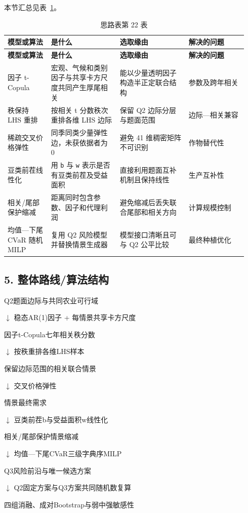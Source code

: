 \documentclass[UTF8,11pt,a4paper]{ctexart}
\begin{document}
\noindent 本节汇总见表~\ref{tab:thought-22}。
\begin{longtable}{@{}>{\raggedright\arraybackslash}p{0.17\linewidth}>{\raggedright\arraybackslash}p{0.27\linewidth}>{\raggedright\arraybackslash}p{0.27\linewidth}>{\raggedright\arraybackslash}p{0.23\linewidth}@{}}
\caption{思路表第 22 表}\label{tab:thought-22}\\
\toprule
\textbf{模型或算法} & \textbf{是什么} & \textbf{选取缘由} & \textbf{解决的问题} \\
\midrule
\endfirsthead
\toprule
\textbf{模型或算法} & \textbf{是什么} & \textbf{选取缘由} & \textbf{解决的问题} \\
\midrule
\endhead
因子 t-Copula & 宏观、气候和类别因子与共享卡方尺度共同产生厚尾相关 & 能以少量透明因子构造半正定联合结构 & 参数及跨年相关 \\
秩保持 LHS 重排 & 按相关 t 分数秩次重排各维 LHS 边际 & 保留 Q2 边际分层与题面范围 & 边际—相关兼容 \\
稀疏交叉价格弹性 & 同季同类少量弹性边，未获依据者为 0 & 避免 41 维稠密矩阵不可识别 & 作物替代性 \\
豆类前茬线性化 & 用 \texttt{b} 与 \texttt{w} 表示是否有豆类前茬及受益面积 & 直接利用题面互补机制且保持线性 & 生产互补性 \\
相关/尾部保护缩减 & 距离同时包含参数、因子和代理利润 & 避免缩减后丢失联合尾部和相关方向 & 计算规模控制 \\
均值—下尾 CVaR 随机 MILP & 复用 Q2 风险模型并替换情景生成器 & 模型接口清晰且可与 Q2 公平比较 & 最终种植优化 \\
\bottomrule
\end{longtable}

\subsection{5. 整体路线/算法结构}

\begin{center}
\begin{minipage}{0.78\linewidth}
\small\raggedright
Q2题面边际与共同农业可行域\par
        \ensuremath{\downarrow} 稳态AR(1)因子 + 每情景共享卡方尺度\par
因子t-Copula七年相关秩分数\par
        \ensuremath{\downarrow} 按秩重排各维LHS样本\par
保留边际范围的相关联合情景\par
        \ensuremath{\downarrow} 交叉价格弹性\par
情景最终需求\par
        \ensuremath{\downarrow} 豆类前茬b与受益面积w线性化\par
相关/尾部保护情景缩减\par
        \ensuremath{\downarrow} 均值—下尾CVaR三级字典序MILP\par
Q3风险前沿与唯一候选方案\par
        \ensuremath{\downarrow} Q2固定方案与Q3方案共同随机数复算\par
四组消融、成对Bootstrap与弱中强敏感性\par
\end{minipage}
\end{center}
\end{document}
